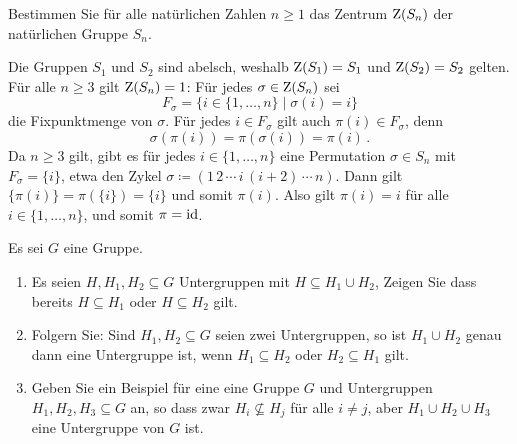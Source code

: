 \begin{question}[subtitle = Das Zentrum der symmetrischen Gruppe]
  Bestimmen Sie für alle natürlichen Zahlen $n \geq 1$ das Zentrum $\operatorname{Z}(S_n)$ der natürlichen Gruppe $S_n$.
\end{question}


\begin{solution}
  Die Gruppen $S_1$ und $S_2$ sind abelsch, weshalb $\operatorname{Z}(S_1) = S_1$ und $\operatorname{Z}(S_2) = S_2$ gelten.
  Für alle $n \geq 3$ gilt $\operatorname{Z}(S_n) = 1$:
  Für jedes $\sigma \in \operatorname{Z}(S_n)$ sei
  \[
      F_\sigma
    = \{ i \in \{1, \dotsc, n\} \mid \sigma(i) = i \}
  \]
  die Fixpunktmenge von $\sigma$.
  Für jedes $i \in F_\sigma$ gilt auch $\pi(i) \in F_\sigma$, denn
  \[
      \sigma(\pi(i))
    = \pi(\sigma(i))
    = \pi(i) \,.
  \]
  Da $n \geq 3$ gilt, gibt es für jedes $i \in \{1, \dotsc, n\}$ eine Permutation $\sigma \in S_n$ mit $F_\sigma = \{i\}$, etwa den Zykel $\sigma \coloneqq (1 \, 2 \, \dotsb \, i \, (i+2) \, \dotsb \, n)$.
  Dann gilt $\{\pi(i)\} = \pi(\{i\}) = \{i\}$ und somit $\pi(i)$.
  Also gilt $\pi(i) = i$ für alle $i \in \{1, \dotsc, n\}$, und somit $\pi = \operatorname{id}$.
\end{solution}


\begin{question}[subtitle = Vereinigung von Untergruppen]
  Es sei $G$ eine Gruppe.
  \begin{enumerate}
    \item
      Es seien $H, H_1, H_2 \subseteq G$ Untergruppen mit $H \subseteq H_1 \cup H_2$,
      Zeigen Sie dass bereits $H \subseteq H_1$ oder $H \subseteq H_2$ gilt.
    \item
      Folgern Sie:
      Sind $H_1, H_2 \subseteq G$ seien zwei Untergruppen, so ist $H_1 \cup H_2$ genau dann eine Untergruppe ist, wenn $H_1 \subseteq H_2$ oder $H_2 \subseteq H_1$ gilt.
    \item
      Geben Sie ein Beispiel für eine eine Gruppe $G$ und Untergruppen $H_1, H_2, H_3 \subseteq G$ an, so dass zwar $H_i \nsubseteq H_j$ für alle $i \neq j$, aber $H_1 \cup H_2 \cup H_3$ eine Untergruppe von $G$ ist.
  \end{enumerate}
\end{question}


